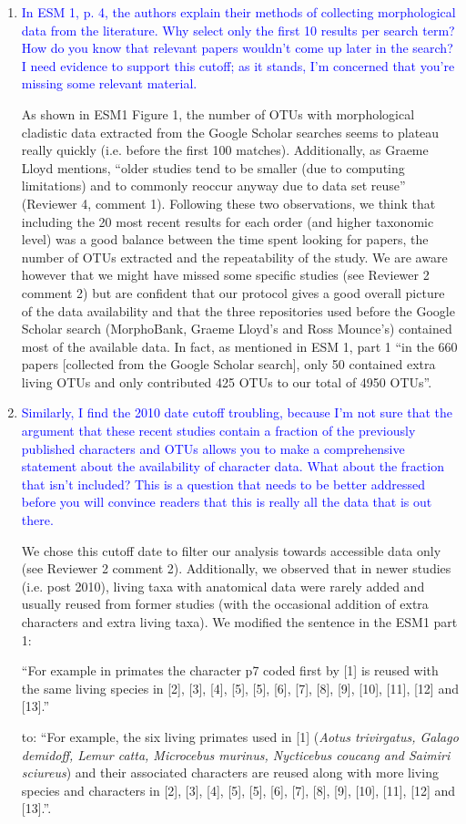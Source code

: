 \documentclass[12pt,letterpaper]{article}
\begin{document}
\begin{enumerate}
\item{\textcolor{blue}{In ESM 1, p. 4, the authors explain their methods of collecting morphological data from the literature. Why select only the first 10 results per search term? How do you know that relevant papers wouldn't come up later in the search? I need evidence to support this cutoff; as it stands, I'm concerned that you're missing some relevant material.}}

As shown in ESM1 Figure 1, the number of OTUs with morphological cladistic data extracted from the Google Scholar searches seems to plateau really quickly (i.e. before the first 100 matches).
Additionally, as Graeme Lloyd mentions, ``older studies tend to be smaller (due to computing limitations) and to commonly reoccur anyway due to data set reuse'' (Reviewer 4, comment 1).
Following these two observations, we think that including the 20 most recent results for each order (and higher taxonomic level) was a good balance between the time spent looking for papers, the number of OTUs extracted and the repeatability of the study.
We are aware however that we might have missed some specific studies (see Reviewer 2 comment 2) but are confident that our protocol gives a good overall picture of the data availability and that the three repositories used before the Google Scholar search (MorphoBank, Graeme Lloyd's and Ross Mounce's) contained most of the available data.
In fact, as mentioned in ESM 1, part 1 ``in the 660 papers [collected from the Google Scholar search], only 50 contained extra living OTUs and only contributed 425 OTUs to our total of 4950 OTUs''.

\item{\textcolor{blue}{Similarly, I find the 2010 date cutoff troubling, because I'm not sure that the argument that these recent studies contain a fraction of the previously published characters and OTUs allows you to make a comprehensive statement about the availability of character data. What about the fraction that isn't included? This is a question that needs to be better addressed before you will convince readers that this is really all the data that is out there.}}

We chose this cutoff date to filter our analysis towards accessible data only (see Reviewer 2 comment 2).
Additionally, we observed that in newer studies (i.e. post 2010), living taxa with anatomical data were rarely added and usually reused from former studies (with the occasional addition of extra characters and extra living taxa).
We modified the sentence in the ESM1 part 1:

``For example in primates the character p7 coded first by [1] is reused with the same living species in [2], [3], [4], [5], [5], [6], [7], [8], [9], [10], [11], [12] and [13].''

\noindent to: ``For example, the six living primates used in [1] (\textit{Aotus trivirgatus, Galago demidoff, Lemur catta, Microcebus murinus, Nycticebus coucang and Saimiri sciureus}) and their associated characters are reused along with more living species and characters in [2], [3], [4], [5], [5], [6], [7], [8], [9], [10], [11], [12] and [13].''.

\end{enumerate}
\end{document}
